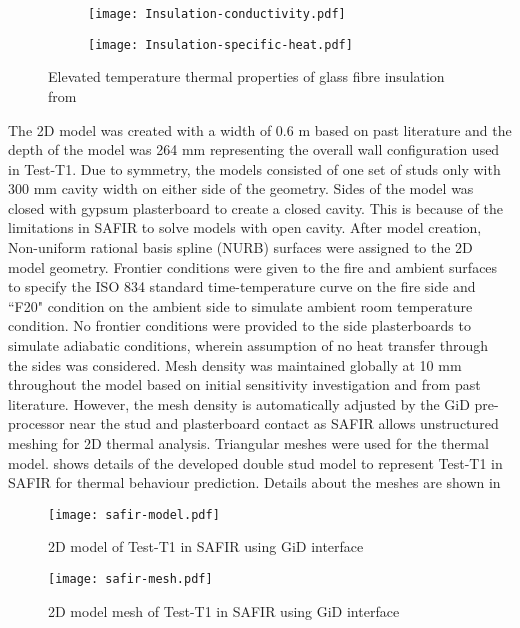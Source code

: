 \begin{figure}[!htbp]
	\centering
	\begin{subfigure}[b]{0.6\textwidth}
		\centering
		\texttt{[image: Insulation-conductivity.pdf]}
		\caption{}
		\label{subfig:Insulation-conductivity}
	\end{subfigure}
	\begin{subfigure}[b]{0.6\textwidth}
		\centering
		\texttt{[image: Insulation-specific-heat.pdf]}
		\caption{}
		\label{subfig:Insulation-specific-heat}
	\end{subfigure}
	   \caption{Elevated temperature thermal properties of glass fibre insulation from \citet{Maneesha2018}}
	   \label{fig:Insulation-thermal}
\end{figure}

The 2D model was created with a width of 0.6 m based on past literature and the depth of the model was 264 mm representing the overall wall configuration used in Test-T1. Due to symmetry, the models consisted of one set of studs only with 300 mm cavity width on either side of the geometry. Sides of the model was closed with gypsum plasterboard to create a closed cavity. This is because of the limitations in SAFIR to solve models with open cavity. After model creation, Non-uniform rational basis spline (NURB) surfaces were assigned to the 2D model geometry. Frontier conditions were given to the fire and ambient surfaces to specify the ISO 834 standard time-temperature curve on the fire side and ``F20" condition on the ambient side to simulate ambient room temperature condition. No frontier conditions were provided to the side plasterboards to simulate adiabatic conditions, wherein assumption of no heat transfer through the sides was considered. Mesh density was maintained globally at 10 mm throughout the model based on initial sensitivity investigation and from past literature. However, the mesh density is automatically adjusted by the GiD pre-processor near the stud and plasterboard contact as SAFIR allows unstructured meshing for 2D thermal analysis. Triangular meshes were used for the thermal model.  shows details of the developed double stud model to represent Test-T1 in SAFIR for thermal behaviour prediction. Details about the meshes are shown in 
\begin{figure}[!htbp]
	\centering
	\texttt{[image: safir-model.pdf]}
	\caption{2D model of Test-T1 in SAFIR using GiD interface}
	\label{fig:safir-model}
\end{figure}
\begin{figure}[!htbp]
	\centering
	\texttt{[image: safir-mesh.pdf]}
	\caption{2D model mesh of Test-T1 in SAFIR using GiD interface}
	\label{fig:safir-mesh}
\end{figure}

